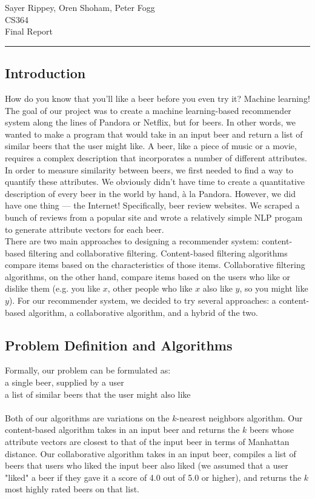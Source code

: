 \documentclass[11pt]{article}
\renewcommand{\maketitle}{
  \begin{center}
    \begin{flushright}
      Sayer Rippey, Oren Shoham, Peter Fogg \\
      CS364 \\
      Final Report
    \end{flushright}
    \rule{\linewidth}{0.1mm}
  \end{center}
}
\begin{document}
\maketitle
\subsection*{Introduction}
How do you know that you'll like a beer before you even try it? Machine learning! The goal of our project was to create a machine learning-based recommender system along the lines of Pandora or Netflix, but for beers. In other words, we wanted to make a program that would take in an input beer and return a list of similar beers that the user might like. A beer, like a piece of music or a movie, requires a complex description that incorporates a number of different attributes. In order to measure similarity between beers, we first needed to find a way to quantify these attributes. We obviously didn't have time to create a quantitative description of every beer in the world by hand, \`{a} la Pandora. However, we did have one thing --- the Internet! Specifically, beer review websites. We scraped a bunch of reviews from a popular site and wrote a relatively simple NLP progam to generate attribute vectors for each beer.  \\
\indent There are two main approaches to designing a recommender system: content-based filtering and collaborative filtering. Content-based filtering algorithms compare items based on the characteristics of those items. Collaborative filtering algorithms, on the other hand, compare items based on the users who like or dislike them (e.g. you like $x$, other people who like $x$ also like $y$, so you might like $y$). For our recommender system, we decided to try several approaches: a content-based algorithm, a collaborative algorithm, and a hybrid of the two.

\subsection*{Problem Definition and Algorithms}
Formally, our problem can be formulated as: \\
 a single beer, supplied by a user \\
 a list of similar beers that the user might also like \\
\\
Both of our algorithms are variations on the $k$-nearest neighbors algorithm. Our content-based algorithm takes in an input beer and returns the $k$ beers whose attribute vectors are closest to that of the input beer in terms of Manhattan distance. Our collaborative algorithm takes in an input beer, compiles a list of beers that users who liked the input beer also liked (we assumed that a user "liked"  a beer if they gave it a score of 4.0 out of 5.0 or higher), and returns the $k$ most highly rated beers on that list.
\end{document}
